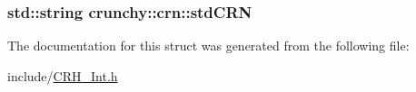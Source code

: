 \subsubsection[{std\+C\+R\+N}]{\setlength{\rightskip}{0pt plus 5cm}std\+::string crunchy\+::crn\+::std\+C\+R\+N\hspace{0.3cm}{\ttfamily [static]}}\label{structcrunchy_1_1crn_ae5f71a10acf2431498d683fee28851db}


The documentation for this struct was generated from the following file\+:\begin{DoxyCompactItemize}
\item 
include/\hyperlink{_c_r_h___int_8h}{C\+R\+H\+\_\+\+Int.\+h}\end{DoxyCompactItemize}
